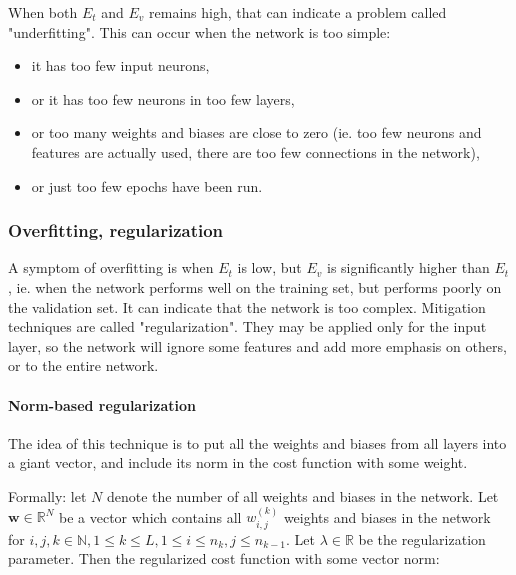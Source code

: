 \documentclass{article}
\begin{document}
        When both $E_t$ and $E_v$ remains high, that can indicate a problem
        called "underfitting". This can occur when the network is too simple:

        \begin{itemize}
          \item it has too few input neurons,

          \item or it has too few neurons in too few layers,

          \item or too many weights and biases are close to zero (ie. too few
                neurons and features are actually used, there are too few
                connections in the network),

          \item or just too few epochs have been run.
        \end{itemize}

      \subsubsection{Overfitting, regularization}

        A symptom of overfitting is when $E_t$ is low, but $E_v$ is
        significantly higher than $E_t$, ie. when the network performs well on
        the training set, but performs poorly on the validation set. It can
        indicate that the network is too complex. Mitigation techniques are
        called "regularization". They may be applied only for the input layer,
        so the network will ignore some features and add more emphasis on
        others, or to the entire network.

        \paragraph{Norm-based regularization}

          The idea of this technique is to put all the weights and biases from
          all layers into a giant vector, and include its norm in the cost
          function with some weight.

          Formally: let $N$ denote the number of all weights and biases in the
          network. Let $\mathbf{w} \in \mathbb{R}^N$ be a vector which contains
          all $w_{i,j}^{(k)}$ weights and biases in the network for
          $i, j, k \in \mathbb{N}, 1 \leq k \leq L, 1 \leq i \leq n_k, j \leq n_{k-1}$.
          Let $\lambda \in \mathbb{R}$ be the regularization parameter. Then
          the regularized cost function with some vector norm:
\end{document}
